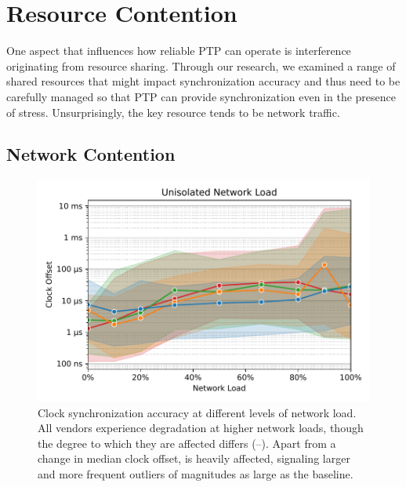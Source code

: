{%

}

\section{Resource Contention}
\label{sec:resource_contention}

One aspect that influences how reliable PTP can operate is interference originating from resource sharing. Through our research, we examined a range of shared resources that might impact synchronization accuracy and thus need to be carefully managed so that PTP can provide synchronization even in the presence of stress. Unsurprisingly, the key resource tends to be network traffic.

\subsection{Network Contention}

\begin{figure}
    \centering
    \includegraphics[width=\linewidth]{res/generated/net_unprioritized_trend_rpi-4.pdf}
    \legend
    \caption{Clock synchronization accuracy at different levels of network load. All vendors experience degradation at higher network loads, though the degree to which they are affected differs (\fRatio{\cmpMin}--\fRatio{\cmpMax}). Apart from a change in median clock offset, \PNineFive{} is heavily affected, signaling larger and more frequent outliers of magnitudes \fRatio[-1]{\cmpMax} as large as the baseline.}
    \label{fig:network_load}
\end{figure}


